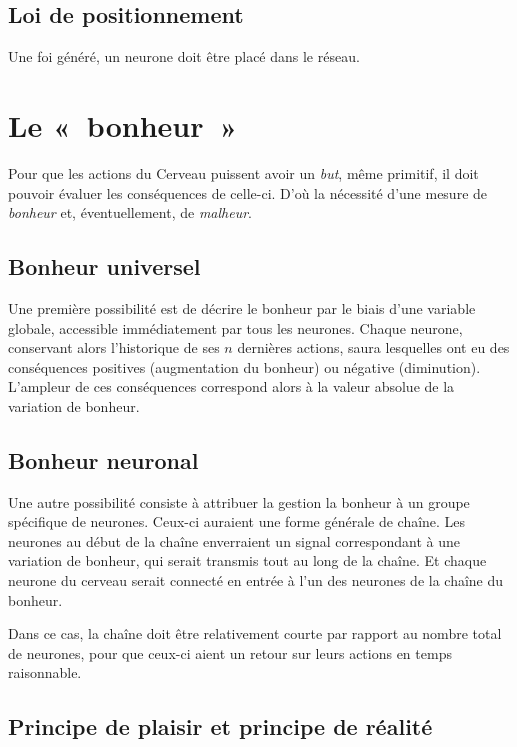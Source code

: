 \documentclass[a4paper,10pt]{article}
\newcommand{\guill}[1]{«~#1~»}
\theoremstyle{definition}
\theoremstyle{remark}
\theoremstyle{plain}
\begin{document}
\subsection{Loi de positionnement}

Une foi généré, un neurone doit être placé dans le réseau.


\section{Le \guill{bonheur}}

Pour que les actions du Cerveau puissent avoir un \emph{but}, même primitif, il doit pouvoir évaluer les conséquences de celle-ci. D'où la nécessité d'une mesure de \emph{bonheur} et, éventuellement, de \emph{malheur}.

\subsection{Bonheur universel}

Une première possibilité est de décrire le bonheur par le biais d'une variable globale, accessible immédiatement par tous les neurones. Chaque neurone, conservant alors l'historique de ses $n$ dernières actions, saura lesquelles ont eu des conséquences positives (augmentation du bonheur) ou négative (diminution). L'ampleur de ces conséquences correspond alors à la valeur absolue de la variation de bonheur.

\subsection{Bonheur neuronal}

Une autre possibilité consiste à attribuer la gestion la bonheur à un groupe spécifique de neurones. Ceux-ci auraient une forme générale de chaîne. Les neurones au début de la chaîne enverraient un signal correspondant à une variation de bonheur, qui serait transmis tout au long de la chaîne. Et chaque neurone du cerveau serait connecté en entrée à l'un des neurones de la chaîne du bonheur.

Dans ce cas, la chaîne doit être relativement courte par rapport au nombre total de neurones, pour que ceux-ci aient un retour sur leurs actions en temps raisonnable.

\subsection{Principe de plaisir et principe de réalité}
\end{document}
